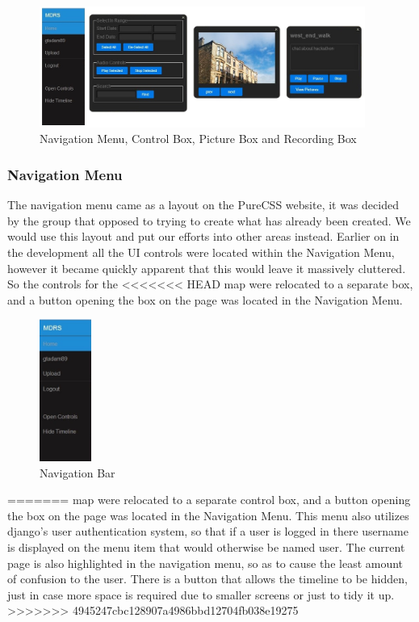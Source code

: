\documentclass{l3proj}
\begin{document}
\begin{figure}[ht!]
  \centering
\includegraphics[width=0.95\textwidth]{images/ui-elements.jpg}
\caption{Navigation Menu, Control Box, Picture Box and Recording Box}
\end{figure}

\subsubsection{Navigation Menu}

The navigation menu came as a layout on the PureCSS website, it was
decided by the group that opposed to trying to create what has already
been created. We would use this layout and put our efforts into other
areas instead. Earlier on in the development all the UI controls were
located within the Navigation Menu, however it became quickly apparent
that this would leave it massively cluttered. So the controls for the
<<<<<<< HEAD
map were relocated to a separate box, and a button opening the box on
the page was located in the Navigation Menu.
\begin{figure}[ht!]
  \centering
\includegraphics[width=0.15\textwidth]{images/nav-bar.jpg}
\caption{Navigation Bar}
\end{figure}
=======
map were relocated to a separate control box, and a button opening the box on
the page was located in the Navigation Menu. This menu also utilizes django's 
user authentication system, so that if a user is logged in there username is 
displayed on the menu item that would otherwise be named user. The current 
page is also highlighted in the navigation menu, so as to cause the least 
amount of confusion to the user. There is a button that allows the timeline to 
be hidden, just in case more space is required due to smaller screens or just to 
tidy it up. 
>>>>>>> 4945247cbc128907a4986bbd12704fb038e19275
\end{document}

